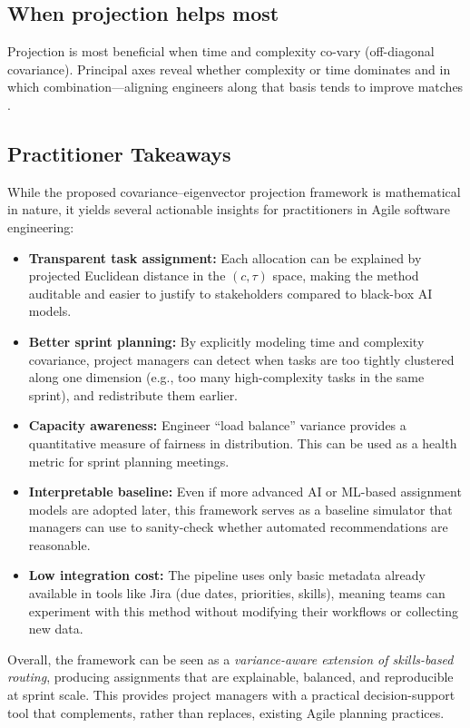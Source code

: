 \documentclass[final,1p,times]{elsarticle}
\begin{document}
\subsection{When projection helps most}
Projection is most beneficial when time and complexity co-vary (off-diagonal covariance). Principal axes reveal whether complexity or time dominates and in which combination—aligning engineers along that basis tends to improve matches \cite{pca2017,eigen_projection}.

\subsection{Practitioner Takeaways}
\label{sec:takeaways}

While the proposed covariance--eigenvector projection framework is mathematical in nature, it yields several actionable insights for practitioners in Agile software engineering:

\begin{itemize}[leftmargin=*]
    \item \textbf{Transparent task assignment:} Each allocation can be explained by projected Euclidean distance in the $(c,\tau)$ space, making the method auditable and easier to justify to stakeholders compared to black-box AI models.
    \item \textbf{Better sprint planning:} By explicitly modeling time and complexity covariance, project managers can detect when tasks are too tightly clustered along one dimension (e.g., too many high-complexity tasks in the same sprint), and redistribute them earlier.
    \item \textbf{Capacity awareness:} Engineer ``load balance'' variance provides a quantitative measure of fairness in distribution. This can be used as a health metric for sprint planning meetings.
    \item \textbf{Interpretable baseline:} Even if more advanced AI or ML-based assignment models are adopted later, this framework serves as a baseline simulator that managers can use to sanity-check whether automated recommendations are reasonable.
    \item \textbf{Low integration cost:} The pipeline uses only basic metadata already available in tools like Jira (due dates, priorities, skills), meaning teams can experiment with this method without modifying their workflows or collecting new data.
\end{itemize}

Overall, the framework can be seen as a \emph{variance-aware extension of skills-based routing}, producing assignments that are explainable, balanced, and reproducible at sprint scale. This provides project managers with a practical decision-support tool that complements, rather than replaces, existing Agile planning practices.
\end{document}
